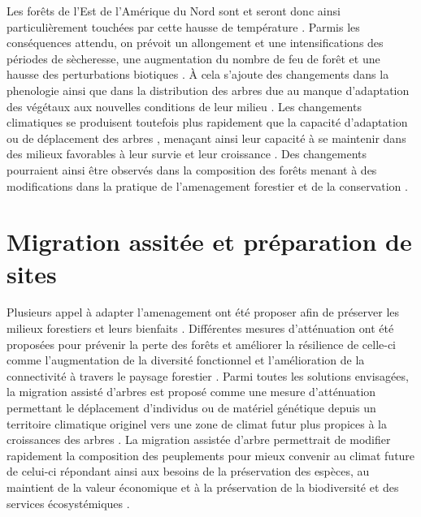 Les forêts de l'Est de l'Amérique du Nord sont et seront donc ainsi particulièrement touchées par cette hausse de température \citep{Park2014Canboreal,Mahony2017closerlook,Messier2022Warningnatural,Sittaro2017Treerange}.
Parmis les conséquences attendu, on prévoit un allongement et une intensifications des périodes de sècheresse, une augmentation du nombre de feu de forêt et une hausse des perturbations biotiques \citep{Gatti2021Amazoniacarbon,Heidari2021Effectsclimate,Joyce2013Climatechange,Parmesan2007Influencesspecies}. 
À cela s'ajoute des changements dans la phenologie \citep{Chuine2010Whydoes} ainsi que dans la distribution des arbres \citep{Gray2013Trackingsuitable,Zhu2012Failuremigrate} due au manque d'adaptation des végétaux aux nouvelles conditions de leur milieu \citep{Aitken2008Adaptationmigration}.
Les changements climatiques se produisent toutefois plus rapidement que la capacité d'adaptation ou de déplacement des arbres \citep{Aitken2008Adaptationmigration,Harrison2020Plantcommunity,Loarie2009velocityclimate,Messier2022Warningnatural,Williams2013Preparingclimate,Vitt2010Assistedmigration}, 
menaçant ainsi leur capacité à se maintenir dans des milieux favorables à leur survie et leur croissance \citep{Sittaro2017Treerange,Woodall2018Decadalchanges,Zhu2012Failuremigrate}.
Des changements pourraient ainsi être observés dans la composition des forêts menant à des modifications dans la pratique de l'amenagement forestier et de la conservation \citep{Chmura2011Forestresponses,Lo2011Linkingclimate,McKenney2009Climatechange}.


\section*{Migration assitée et préparation de sites}
\label{sec:fam}

Plusieurs appel à adapter l'amenagement ont été proposer afin de préserver les milieux forestiers et leurs bienfaits \citep{Messier2021sakeresilience,Nagel2017Adaptivesilviculture}.
Différentes mesures d'atténuation ont été proposées pour prévenir la perte des forêts et améliorer la résilience de celle-ci comme l'augmentation de la diversité fonctionnel et l'amélioration de la connectivité à travers le paysage forestier \citep{Messier2019functionalcomplex}.
Parmi toutes les solutions envisagées, la migration assisté d'arbres est proposé comme une mesure d'atténuation permettant le déplacement d'individus ou de matériel génétique depuis un territoire climatique originel vers une zone de climat futur plus propices à la croissances des arbres \citep{Dumroese2015Considerationsrestoring,Palik2022Operationalizingforestassisted,Park2023Provenancetrials,Park2018Informationunderload,Pedlar2011implementationassisted,Vitt2010Assistedmigration,Williams2013Preparingclimate}. 
La migration assistée d'arbre permettrait de modifier rapidement la composition des peuplements pour mieux convenir au climat future de celui-ci \citep{Pedlar2011implementationassisted} 
répondant ainsi aux besoins de la préservation des espèces, au maintient de la valeur économique et à la préservation de la biodiversité et des services écosystémiques \citep{Ste-Marie2011Assistedmigration,Winder2011Ecologicalimplications}.

